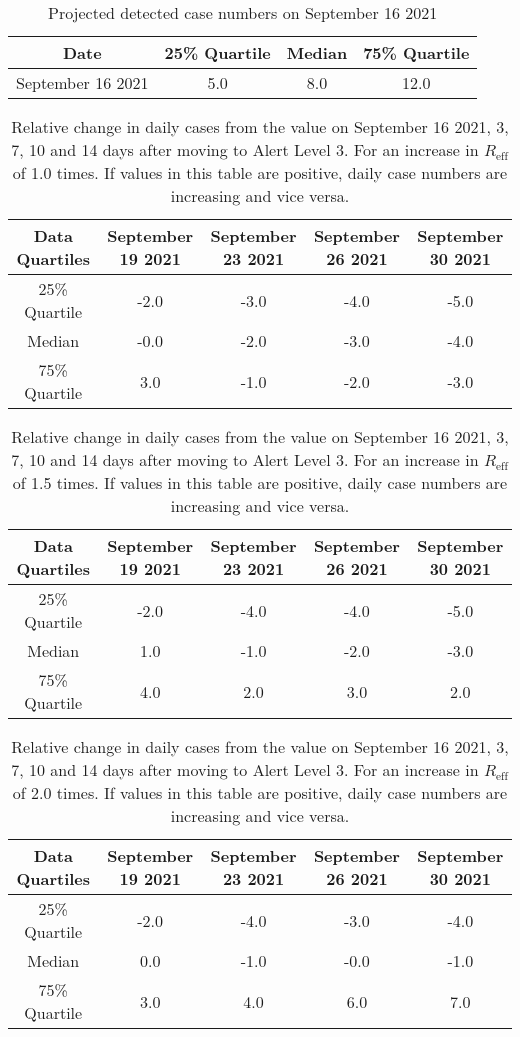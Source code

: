 
\begin{table}[h] 
 \centering 
 \begin{tabular}{c|c|c|c}
Date & 25\% Quartile & Median & 75\% Quartile \\
\hline
September 16 2021 & 5.0 & 8.0 & 12.0\\
\end{tabular}
\caption{Projected detected case numbers on September 16 2021}
\label{tab:BP_predicted_cases}
\end{table}

\begin{table}[h] 
 \centering 
 \begin{tabular}{c|c|c|c|c}
Data Quartiles & September 19 2021 & September 23 2021 & September 26 2021 & September 30 2021\\
\hline
25\% Quartile & -2.0 & -3.0 & -4.0 & -5.0\\
Median & -0.0 & -2.0 & -3.0 & -4.0\\
75\% Quartile & 3.0 & -1.0 & -2.0 & -3.0\\
\end{tabular}
\caption{Relative change in daily cases from the value on September 16 2021, 3, 7, 10 and 14 days after moving to Alert Level 3. For an increase in $R_\text{eff}$ of 1.0 times. If values in this table are positive, daily case numbers are increasing and vice versa.}
\label{tab:BP_predicted_cases_1.0}
\end{table}
\begin{table}[h] 
 \centering 
 \begin{tabular}{c|c|c|c|c}
Data Quartiles & September 19 2021 & September 23 2021 & September 26 2021 & September 30 2021\\
\hline
25\% Quartile & -2.0 & -4.0 & -4.0 & -5.0\\
Median & 1.0 & -1.0 & -2.0 & -3.0\\
75\% Quartile & 4.0 & 2.0 & 3.0 & 2.0\\
\end{tabular}
\caption{Relative change in daily cases from the value on September 16 2021, 3, 7, 10 and 14 days after moving to Alert Level 3. For an increase in $R_\text{eff}$ of 1.5 times. If values in this table are positive, daily case numbers are increasing and vice versa.}
\label{tab:BP_predicted_cases_1.5}
\end{table}
\begin{table}[h] 
 \centering 
 \begin{tabular}{c|c|c|c|c}
Data Quartiles & September 19 2021 & September 23 2021 & September 26 2021 & September 30 2021\\
\hline
25\% Quartile & -2.0 & -4.0 & -3.0 & -4.0\\
Median & 0.0 & -1.0 & -0.0 & -1.0\\
75\% Quartile & 3.0 & 4.0 & 6.0 & 7.0\\
\end{tabular}
\caption{Relative change in daily cases from the value on September 16 2021, 3, 7, 10 and 14 days after moving to Alert Level 3. For an increase in $R_\text{eff}$ of 2.0 times. If values in this table are positive, daily case numbers are increasing and vice versa.}
\label{tab:BP_predicted_cases_2.0}
\end{table}
